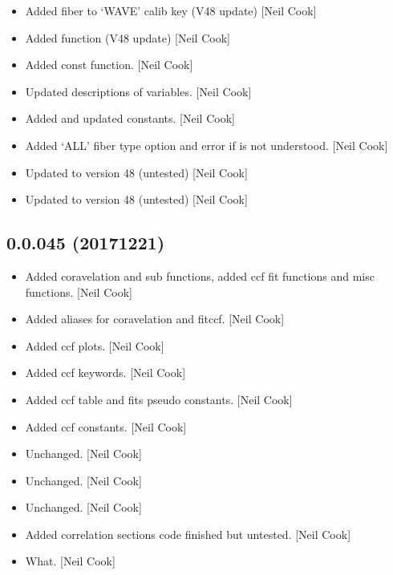 \documentclass[a4paper,10pt,english]{report}
\begin{document}
\begin{itemize}
\item {} 
Added fiber to ‘WAVE’ calib key (V48 update) {[}Neil Cook{]}

\item {} 
Added  function (V48 update) {[}Neil Cook{]}

\item {} 
Added  const function. {[}Neil Cook{]}

\item {} 
Updated descriptions of  variables. {[}Neil Cook{]}

\item {} 
Added and updated  constants. {[}Neil Cook{]}

\item {} 
Added ‘ALL’ fiber type option and error if  is not
understood. {[}Neil Cook{]}

\item {} 
Updated to version 48 (untested) {[}Neil Cook{]}

\item {} 
Updated to version 48 (untested) {[}Neil Cook{]}

\end{itemize}


\subsection{0.0.045 (2017\sphinxhyphen{}12\sphinxhyphen{}21)}
\label{\detokenize{misc/changelog:id525}}\begin{itemize}
\item {} 
Added coravelation and sub functions, added ccf fit functions and misc
functions. {[}Neil Cook{]}

\item {} 
Added aliases for coravelation and fitccf. {[}Neil Cook{]}

\item {} 
Added ccf plots. {[}Neil Cook{]}

\item {} 
Added ccf keywords. {[}Neil Cook{]}

\item {} 
Added ccf table and fits pseudo constants. {[}Neil Cook{]}

\item {} 
Added ccf constants. {[}Neil Cook{]}

\item {} 
Unchanged. {[}Neil Cook{]}

\item {} 
Unchanged. {[}Neil Cook{]}

\item {} 
Unchanged. {[}Neil Cook{]}

\item {} 
Added correlation sections \sphinxhyphen{} code finished but untested. {[}Neil Cook{]}

\item {} 
What. {[}Neil Cook{]}

\end{itemize}
\end{document}
